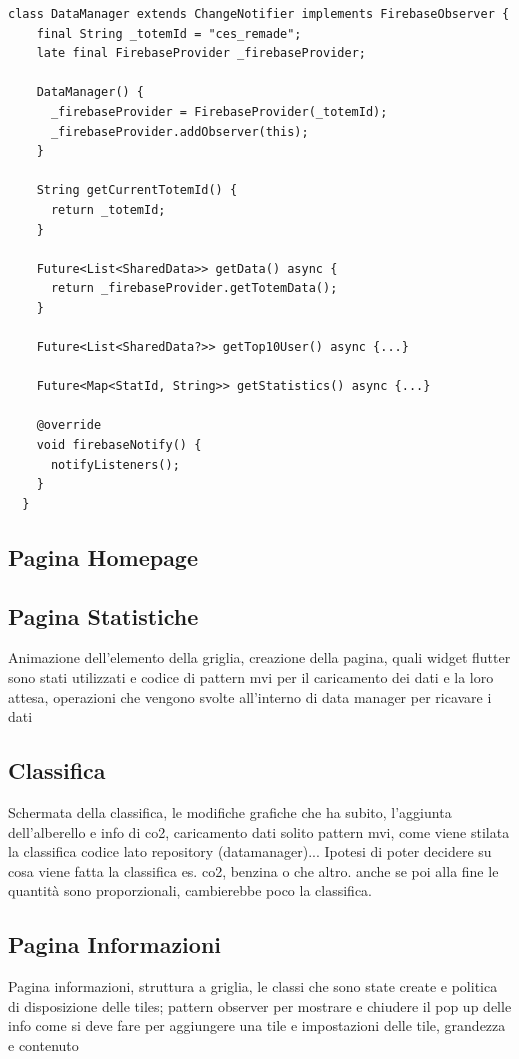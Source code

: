 \begin{lstlisting}[style=FlutterStyle, caption={Classe DataManager}, label={lst:dataManager}]
  class DataManager extends ChangeNotifier implements FirebaseObserver {
    final String _totemId = "ces_remade";
    late final FirebaseProvider _firebaseProvider;
  
    DataManager() {
      _firebaseProvider = FirebaseProvider(_totemId);
      _firebaseProvider.addObserver(this);
    }
  
    String getCurrentTotemId() {
      return _totemId;
    }
  
    Future<List<SharedData>> getData() async {
      return _firebaseProvider.getTotemData();
    }
  
    Future<List<SharedData?>> getTop10User() async {...}
  
    Future<Map<StatId, String>> getStatistics() async {...}
  
    @override
    void firebaseNotify() {
      notifyListeners(); 
    }
  }
\end{lstlisting}

\subsection{Pagina Homepage}

\subsection{Pagina Statistiche}
Animazione dell'elemento della griglia, creazione della pagina, quali widget flutter sono stati utilizzati e codice di pattern mvi per il caricamento dei dati e la loro attesa, operazioni che vengono svolte all'interno di data manager per ricavare i dati

\subsection{Classifica}
Schermata della classifica, le modifiche grafiche che ha subito, l'aggiunta dell'alberello e info di co2, caricamento dati solito pattern mvi, come viene stilata la classifica codice lato repository (datamanager)... Ipotesi di poter decidere su cosa viene fatta la classifica es. co2, benzina o che altro. anche se poi alla fine le quantità sono proporzionali, cambierebbe poco la classifica.

\subsection{Pagina Informazioni}
Pagina informazioni, struttura a griglia, le classi che sono state create e politica di disposizione delle tiles;  pattern observer per mostrare e chiudere il pop up delle info
come si deve fare per aggiungere una tile e impostazioni delle tile, grandezza e contenuto
